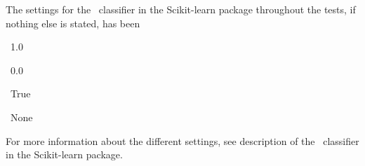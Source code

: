 The settings for the \bn\ \nb classifier in the Scikit-learn package throughout the tests, if nothing else is stated, has been
\begin{description}[noitemsep,labelindent=0.5cm]
\small
	\item[Alpha:] \ 1.0
	\item[Binarize:] \ 0.0
	\item[Fit prior:]\ True
	\item[Class prior:] \ None
\end{description}
For more information about the different settings, see description of the \bn\ \nb classifier in the Scikit-learn package.